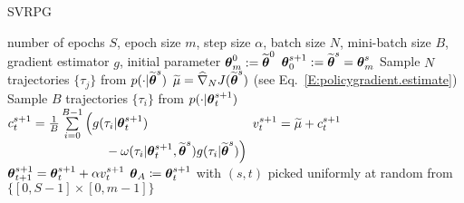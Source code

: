 \begin{algorithm}[h]
	\caption{SVRPG}
	\label{alg:svrpg}
	\begin{algorithmic}[1]
		 number of epochs $S$, epoch size $m$, step size $\alpha$, batch size $N$, mini-batch size $B$, gradient estimator $g$, initial parameter $\vtheta_{m}^0 := \wt{\vtheta}^0$
		\STATE $\vtheta_0^{s+1} := \wt{\vtheta}^{s} = \vtheta_{m}^s$
		\STATE Sample $N$ trajectories $\{\tau_j\}$ from $p(\cdot\vert\wt{\vtheta}^{s})$
		\STATE $ \wt{\mu} = \gradApp{\wt{\vtheta}^{s}}{N}$ (see Eq.~\eqref{E:policygradient.estimate})%
		\STATE Sample $B$ trajectories $\{\tau_i\}$ from $p(\cdot\vert\vtheta_t^{s+1})$
		\STATE $c^{s+1}_t = \frac{1}{B} \sum\limits_{i=0}^{B-1}
		\begin{aligned}[t]
		\Big( & g(\tau_i|\vtheta_t^{s+1})\\ 
		& \quad{} - \omega(\tau_i|\vtheta^{s+1}_t, \wt{\vtheta}^s) g(\tau_i| \wt{\vtheta}^s) \Big)
		\end{aligned}$
		\STATE $v^{s+1}_t = \wt{\mu} + c^{s+1}_t$ %
		\STATE $\vtheta_{t+1}^{s+1} = \vtheta_t^{s+1} + \alpha v^{s+1}_t$
		\ENDFOR
		\ENDFOR
		 $\vtheta_A\coloneqq\vtheta_t^{s+1}$ with $(s,t)$ picked uniformly at random from $\{[0,S-1]\times[0,m-1]\}$
	\end{algorithmic}
\end{algorithm} 


